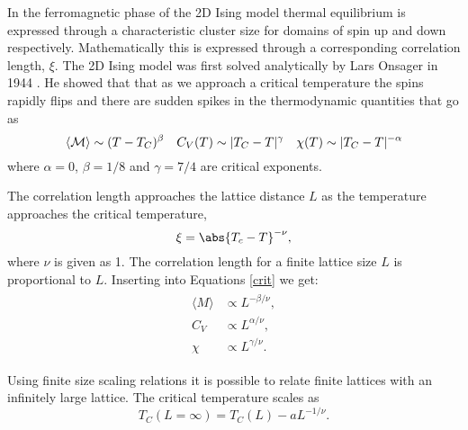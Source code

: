 \documentclass[a4paper]{article}
\begin{document}



In the ferromagnetic phase of the 2D Ising model thermal equilibrium is expressed through a characteristic cluster size for domains of spin up and down respectively. Mathematically this is expressed through a corresponding correlation length, $\xi$. The 2D Ising model was first solved analytically by Lars Onsager in 1944 \cite{PhysRev.65.117}. He showed that that as we approach a critical temperature the spins rapidly flips and there are sudden spikes in the thermodynamic quantities that go as
\begin{equation}
\langle\mathcal{M}\rangle \sim (T - T_C)^\beta\quad C_V(T) \sim |T_C - T|^\gamma\quad \chi (T) \sim |T_C - T|^{-\alpha}\\
\label{crit}
\end{equation}
where $\alpha = 0$, $\beta = 1/8$ and $\gamma = 7/4$ are critical exponents.



The correlation length approaches the lattice distance $L$ as the temperature approaches the critical temperature,
\begin{equation}
    \xi = \abs{T_c-T}^{-\nu},
\end{equation}
where $\nu$ is given as 1. The correlation length for a finite lattice size $L$  is proportional to $L$. Inserting into Equations \ref{crit} we get:
\begin{align}
    \begin{split}
        \langle M \rangle &\propto L^{-\beta/\nu}, \\
        C_V &\propto L^{\alpha/\nu}, \\
        \chi &\propto L^{\gamma/\nu}.
    \end{split}
\end{align}

Using finite size scaling relations it is possible to relate finite lattices with  an infinitely large lattice. The critical temperature scales as
\begin{equation}
  T_C(L=\infty) = T_C(L)-aL^{-1/\nu} \label{eq:noe}.
\end{equation}
\end{document}
